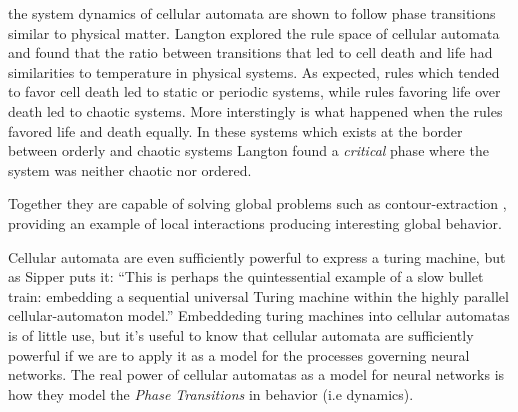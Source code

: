 the system dynamics of cellular automata are shown to follow phase transitions
similar to physical matter.
Langton explored the rule space of cellular automata and found that the ratio
between transitions that led to cell death and life had similarities to
temperature in physical systems.
As expected, rules which tended to favor cell death led to static or periodic
systems, while rules favoring life over death led to chaotic systems.
More interstingly is what happened when the rules favored life and death
equally.
In these systems which exists at the border between orderly and chaotic systems
Langton found a \emph{critical} phase where the system was neither chaotic nor
ordered.


Together they are capable of solving global problems such
as contour-extraction \cite{sipper_emergence_1999}, providing an example of
local interactions producing interesting global behavior.\par
Cellular automata are even sufficiently powerful to express a turing machine,
but as Sipper puts it: ``This is perhaps the quintessential example of a slow
bullet train: embedding a sequential universal Turing machine within the
highly parallel cellular-automaton model.''
Embeddeding turing machines into cellular automatas is of little use, but it's
useful to know that cellular automata are sufficiently powerful if we are to
apply it as a model for the processes governing neural networks.
The real power of cellular automatas as a model for neural networks is how they
model the \emph{Phase Transitions} in behavior (i.e dynamics).


